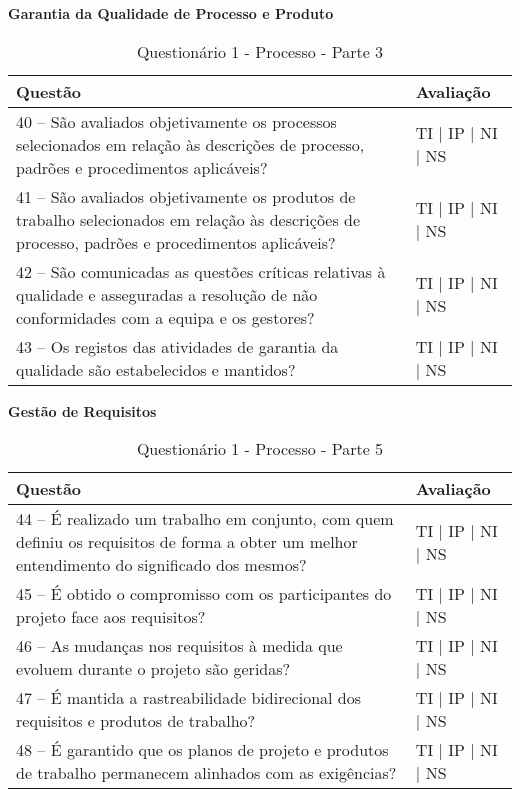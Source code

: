 \documentclass[openany,10pt,a4paper]{article}
\begin{document}
\begin{appendix}
\begin{table}[h]
\textbf{Garantia da Qualidade de Processo e Produto}
	\centering
	\caption{Questionário 1 - Processo - Parte 3}
	\begin{tabular}{p{3.5in}p{2in}}		
		\toprule
		\textbf{Questão}  & \textbf{Avaliação}\\ 
		\midrule
		40 – São avaliados objetivamente os processos selecionados em relação às descrições de 
processo, padrões e procedimentos aplicáveis?
 & TI | IP | NI | NS \\
        \midrule
		41 – São avaliados objetivamente os produtos de trabalho selecionados em relação às descrições 
de processo, padrões e procedimentos aplicáveis?
 & TI | IP | NI | NS \\
		\midrule
		42 – São comunicadas as questões críticas relativas à qualidade e asseguradas a resolução de 
não conformidades com a equipa e os gestores?
 & TI | IP | NI | NS \\
		\midrule
        43 – Os registos das atividades de garantia da qualidade são estabelecidos e mantidos?
 & TI | IP | NI | NS \\
		\bottomrule
	\end{tabular} 
	\label{tab:tabela1}
\end{table}

\begin{table}[h]
\textbf{Gestão de Requisitos}
	\centering
	\caption{Questionário 1 - Processo - Parte 5}
	\begin{tabular}{p{3.5in}p{2in}}		
		\toprule
		\textbf{Questão}  & \textbf{Avaliação}\\ 
		\midrule
		44 – É realizado um trabalho em conjunto, com quem definiu os requisitos de forma a obter um 
melhor entendimento do significado dos mesmos?
 & TI | IP | NI | NS \\
        \midrule
		45 – É obtido o compromisso com os participantes do projeto face aos requisitos?
 & TI | IP | NI | NS \\
		\midrule
		46 – As mudanças nos requisitos à medida que evoluem durante o projeto são geridas?
 & TI | IP | NI | NS \\
		\midrule
        47 – É mantida a rastreabilidade bidirecional dos requisitos e produtos de trabalho?
 & TI | IP | NI | NS \\
		\midrule
		48 – É garantido que os planos de projeto e produtos de trabalho permanecem alinhados com 
as exigências?
  & TI | IP | NI | NS \\
		\bottomrule
	\end{tabular} 
	\label{tab:tabela1}
\end{table}


\end{appendix}
\end{document}
